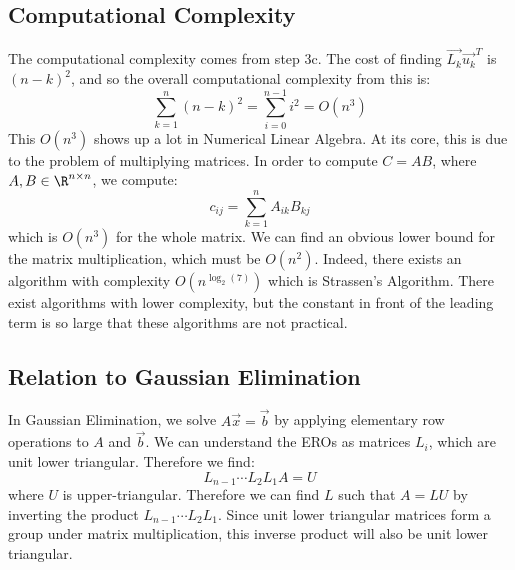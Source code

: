 \documentclass[../Main.tex]{subfiles}
\begin{document}
\subsection{Computational Complexity}
The computational complexity comes from step 3c. The cost of finding $\vec{L_k} \vec{u_k}^T$ is $(n-k)^2$, and so the overall computational complexity from this is:
\begin{equation*}
    \sum_{k=1}^{n} (n-k)^2 = \sum_{i=0}^{n-1}i^2 = O(n^3)
\end{equation*}
This $O(n^3)$ shows up a lot in Numerical Linear Algebra. At its core, this is due to the problem of multiplying matrices. In order to compute $C = AB$, where $A, B \in \R^{n \times n}$, we compute:
\begin{equation*}
    c_{ij} = \sum_{k=1}^{n} A_{ik} B_{kj}
\end{equation*}
which is $O(n^3)$ for the whole matrix. We can find an obvious lower bound for the matrix multiplication, which must be $O(n^2)$. Indeed, there exists an algorithm with complexity $O(n^{\log_2(7)})$ which is Strassen's Algorithm. There exist algorithms with lower complexity, but the constant in front of the leading term is so large that these algorithms are not practical.
\subsection{Relation to Gaussian Elimination}
In Gaussian Elimination, we solve $A\vec{x} = \vec{b}$ by applying elementary row operations to $A$ and $\vec{b}$. We can understand the EROs as matrices $L_i$, which are unit lower triangular. Therefore we find:
\begin{equation*}
    L_{n-1} \cdots L_2 L_1 A = U
\end{equation*}
where $U$ is upper-triangular. Therefore we can find $L$ such that $A = LU$ by inverting the product $L_{n-1} \cdots L_2 L_1$. Since unit lower triangular matrices form a group under matrix multiplication, this inverse product will also be unit lower triangular.
\end{document}
